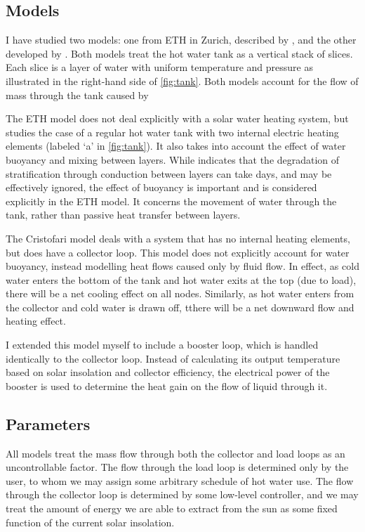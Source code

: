 \documentclass{article}
\begin{document}
\subsection{Models}

I have studied two models: one from ETH in Zurich, described by \textcite{Pfeiffer11}, and the other developed by \textcite{Cristofari02}.
Both models treat the hot water tank as a vertical stack of slices.
Each slice is a layer of water with uniform temperature and pressure as illustrated in the right-hand side of \autoref{fig:tank}.
Both models account for the flow of mass through the tank caused by 

The ETH model does not deal explicitly with a solar water heating system, but studies the case of a regular hot water tank with two internal electric heating elements (labeled `a' in \autoref{fig:tank}).
It also takes into account the effect of water buoyancy and mixing between layers.
While \textcite{Hollands89} indicates that the degradation of stratification through conduction between layers can take days, and may be effectively ignored, the effect of buoyancy is important and is considered explicitly in the ETH model.
It concerns the movement of water through the tank, rather than passive heat transfer between layers.

The Cristofari model deals with a system that has no internal heating elements, but does have a collector loop.
This model does not explicitly account for water buoyancy, instead modelling heat flows caused only by fluid flow.
In effect, as cold water enters the bottom of the tank and hot water exits at the top (due to load), there will be a net cooling effect on all nodes.
Similarly, as hot water enters from the collector and cold water is drawn off, tthere will be a net downward flow and heating effect.

I extended this model myself to include a booster loop, which is handled identically to the collector loop.
Instead of calculating its output temperature based on solar insolation and collector efficiency, the electrical power of the booster is used to determine the heat gain on the flow of liquid through it.

\subsection{Parameters}

All models treat the mass flow through both the collector and load loops as an uncontrollable factor.
The flow through the load loop is determined only by the user, to whom we may assign some arbitrary schedule of hot water use.
The flow through the collector loop is determined by some low-level controller, and we may treat the amount of energy we are able to extract from the sun as some fixed function of the current solar insolation.
\end{document}

